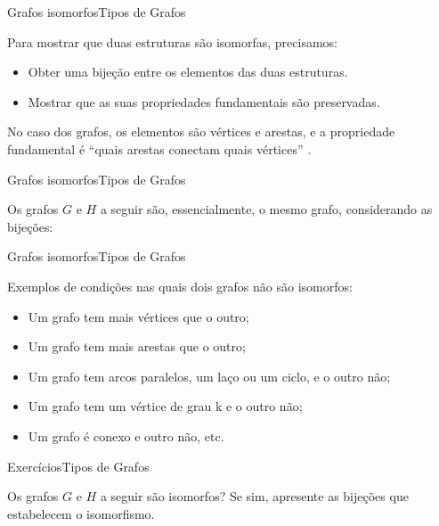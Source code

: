 \documentclass[t]{beamer}
\begin{document}

\begin{ftst}{Grafos isomorfos}{Tipos de Grafos}

Para mostrar que duas estruturas são isomorfas, precisamos:
\vone
\begin{itemize}
    \item Obter uma bijeção entre os elementos das duas estruturas.
    \item Mostrar que as suas propriedades fundamentais são preservadas.
\end{itemize}

\vone

No caso dos grafos, os elementos são vértices e arestas, e a propriedade fundamental é “quais arestas conectam quais vértices” .
\end{ftst}



\begin{ftst}{Grafos isomorfos}{Tipos de Grafos}

Os grafos $G$ e $H$ a seguir são, essencialmente, o mesmo grafo, considerando as bijeções:
\vone


\end{ftst}



\begin{ftst}{Grafos isomorfos}{Tipos de Grafos}

Exemplos de condições nas quais dois grafos não são isomorfos:
\vone
\begin{itemize}
    \item Um grafo tem mais vértices que o outro;
    \item Um grafo tem mais arestas que o outro;
    \item Um grafo tem arcos paralelos, um laço ou um ciclo, e o outro não;
    \item Um grafo tem um vértice de grau k e o outro não;
    \item Um grafo é conexo e outro não, etc. 
\end{itemize}

\end{ftst}



\begin{ftst}{Exercícios}{Tipos de Grafos}

Os grafos $G$ e $H$ a seguir são isomorfos? Se sim, apresente as bijeções que estabelecem o isomorfismo.

\vone
\centering


\end{ftst}
\end{document}
